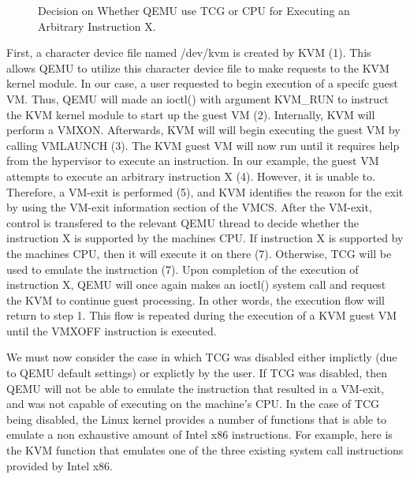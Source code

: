 \documentclass{report}
\begin{document}
\begin{spacing}{1.5}
\newpage
\vfill
{}
\begin{figure}[ht]
    \centering
    \caption{Decision on Whether QEMU use TCG or CPU for Executing an Arbitrary Instruction X.}
\end{figure}




{\large
First, a character device file named /dev/kvm is created by KVM (1). This allows QEMU to utilize this character device file to make requests to the KVM kernel module. In our case, a user requested to begin execution of a specifc guest VM. Thus, QEMU will made an ioctl() with argument KVM\_RUN to instruct the KVM kernel module to start up the guest VM (2). Internally, KVM will perform a VMXON. Afterwards, KVM will will begin executing the guest VM by calling VMLAUNCH (3). The KVM guest VM will now run until it requires help from the hypervisor to execute an instruction. In our example, the guest VM attempts to execute an arbitrary instruction X (4). However, it is unable to. Therefore, a VM-exit is performed (5), and KVM identifies the reason for the exit by using the VM-exit information section of the VMCS. After the VM-exit, control is transfered to the relevant QEMU thread to decide whether the instruction X is supported by the machines CPU. If instruction X is supported by the machines CPU, then it will execute it on there (7). Otherwise, TCG will be used to emulate the instruction (7). Upon completion of the execution of instruction X, QEMU will once again makes an ioctl() system call and request the KVM to continue guest processing. In other words, the execution flow will return to step 1. This flow is repeated during the execution of a KVM guest VM until the VMXOFF instruction is executed.
\newline
}





{\large
We must now consider the case in which TCG was disabled either implictly (due to QEMU default settings) or explictly by the user. If TCG was disabled, then QEMU will not be able to emulate the instruction that resulted in a VM-exit, and was not capable of executing on the machine's CPU. In the case of TCG being disabled, the Linux kernel provides a number of functions that is able to emulate a non exhaustive amount of Intel x86 instructions. For example, here is the KVM function that emulates one of the three existing system call instructions provided by Intel x86. 
\newline
}


\end{spacing}
\end{document}
